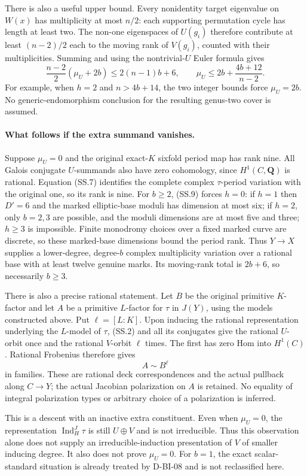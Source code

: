 There is also a useful upper bound.  Every nonidentity target
eigenvalue on $W(x)$ has multiplicity at most $n/2$: each
supporting permutation cycle has length at least two.
The non-one eigenspaces of $U(g_i)$ therefore contribute at least
$(n-2)/2$ each to the moving rank of $V(g_i)$, counted with their
multiplicities.  Summing and using the nontrivial-$U$ Euler formula
gives
\[
  \frac{n-2}{2}(\mu_U+2b)\le2(n-1)b+6,
  \qquad
  \mu_U\le 2b+\frac{4b+12}{n-2}.
 \tag{SS.17}
\]
For example, when $h=2$ and $n>4b+14$, the two integer bounds
force $\mu_U=2b$.  No generic-endomorphism conclusion for the
resulting genus-two cover is assumed.

\paragraph{What follows if the extra summand vanishes.}
Suppose $\mu_U=0$ and the original exact-$K$ sixfold period map
has rank nine.  All Galois conjugate $U$-summands also have zero
cohomology, since $H^1(C,\mathbf Q)$ is rational.
Equation (SS.7) identifies the complete complex $\tau$-period
variation with the original one, so its rank is nine.
For $b\ge2$, (SS.9) forces $h=0$: if $h=1$ then $D'=6$ and
the marked elliptic-base moduli has dimension at most six;
if $h=2$, only $b=2,3$ are possible, and the moduli dimensions
are at most five and three; $h\ge3$ is impossible.
Finite monodromy choices over a fixed marked curve are discrete,
so these marked-base dimensions bound the period rank.
Thus $Y\to X$ supplies a lower-degree, degree-$b$ complex
multiplicity variation over a rational base with at least twelve
genuine marks.  Its moving-rank total is $2b+6$, so necessarily
$b\ge3$.

There is also a precise rational statement.  Let $B$ be the
original primitive $K$-factor and let $A$ be a primitive $L$-factor
for $\tau$ in $J(Y)$, using the models constructed above.  Put
$\ell=[L:K]$.  Upon inducing the rational representation
underlying the $L$-model of $\tau$, (SS.2) and all its conjugates
give the rational $U$-orbit once and the rational $V$-orbit
$\ell$ times.  The first has zero Hom into $H^1(C)$.
Rational Frobenius therefore gives
\[
                              A\sim B^\ell
 \tag{SS.10}
\]
in families.  These are rational deck correspondences and the
actual pullback along $C\to Y$; the actual Jacobian polarization
on $A$ is retained.  No equality of integral polarization types
or arbitrary choice of a polarization is inferred.

This is a descent with an inactive extra constituent.  Even when
$\mu_U=0$, the representation $\operatorname{Ind}_H^J\tau$
is still $U\oplus V$ and is not irreducible.  Thus this observation
alone does not supply an irreducible-induction presentation of
$V$ of smaller inducing degree.  It also does not prove
$\mu_U=0$.  For $b=1$, the exact scalar-standard situation is
already treated by D-BI-08 and is not reclassified here.


